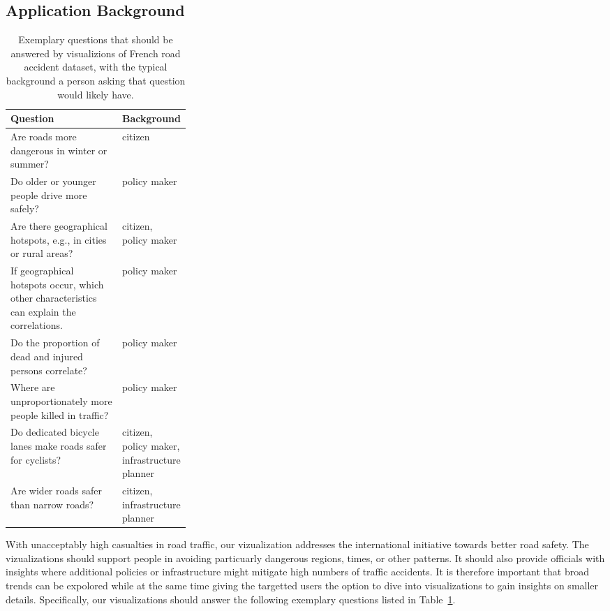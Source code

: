 \subsection{Application Background}
\begin{table}
    \caption{Exemplary questions that should be answered by visualizions of French road accident dataset, with the typical background a person asking that question would likely have.}
    \label{table-questions}
    \begin{tabularx}{\linewidth}{Xp{0.3\linewidth}}
        \toprule
        \textbf{Question} & \textbf{Background} \\
        \midrule
        Are roads more dangerous in winter or summer? & citizen \\
        Do older or younger people drive more safely? & policy maker \\
        Are there geographical hotspots, e.g., in cities or rural areas? & citizen, policy maker \\
        If geographical hotspots occur, which other characteristics can explain the correlations. & policy maker \\
        Do the proportion of dead and injured persons correlate? & policy maker \\
        Where are unproportionately more people killed in traffic? & policy maker \\
        Do dedicated bicycle lanes make roads safer for cyclists? & citizen, policy maker, infrastructure planner \\
        Are wider roads safer than narrow roads? & citizen, infrastructure planner \\
        \bottomrule
    \end{tabularx}
\end{table}
With unacceptably high casualties in road traffic, our vizualization addresses the international initiative towards better road safety. The vizualizations should support people in avoiding particuarly dangerous regions, times, or other patterns. It should also provide officials with insights where additional policies or infrastructure might mitigate high numbers of traffic accidents. It is therefore important that broad trends can be expolored while at the same time giving the targetted users the option to dive into visualizations to gain insights on smaller details.
Specifically, our visualizations should answer the following exemplary questions listed in Table~\ref{table-questions}.

